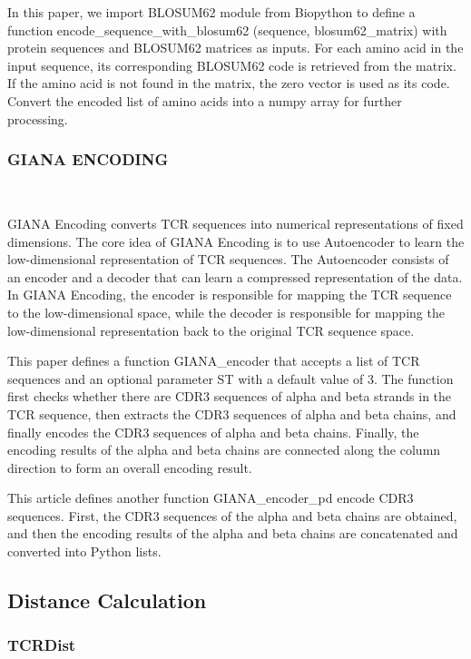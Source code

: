 \documentclass[conference]{IEEEtran}
\begin{document}
	In this paper, we import BLOSUM62 module from Biopython to define a function encode\_sequence\_with\_blosum62 (sequence, blosum62\_matrix) with protein sequences and BLOSUM62 matrices as inputs. For each amino acid in the input sequence, its corresponding BLOSUM62 code is retrieved from the matrix. If the amino acid is not found in the matrix, the zero vector is used as its code. Convert the encoded list of amino acids into a numpy array for further processing.
	
	\subsubsection{GIANA ENCODING} \
	
	GIANA Encoding\cite{b2} converts TCR sequences into numerical representations of fixed dimensions. The core idea of GIANA Encoding is to use Autoencoder to learn the low-dimensional representation of TCR sequences. The Autoencoder consists of an encoder and a decoder that can learn a compressed representation of the data. In GIANA Encoding, the encoder is responsible for mapping the TCR sequence to the low-dimensional space, while the decoder is responsible for mapping the low-dimensional representation back to the original TCR sequence space.
	
	This paper defines a function GIANA\_encoder that accepts a list of TCR sequences and an optional parameter ST with a default value of 3. The function first checks whether there are CDR3 sequences of alpha and beta strands in the TCR sequence, then extracts the CDR3 sequences of alpha and beta chains, and finally encodes the CDR3 sequences of alpha and beta chains. Finally, the encoding results of the alpha and beta chains are connected along the column direction to form an overall encoding result.
	
	
	This article defines another function GIANA\_encoder\_pd encode CDR3 sequences. First, the CDR3 sequences of the alpha and beta chains are obtained, and then the encoding results of the alpha and beta chains are concatenated and converted into Python lists.
	\subsection{Distance Calculation}
	
	\subsubsection{TCRDist} \
	
\end{document}
